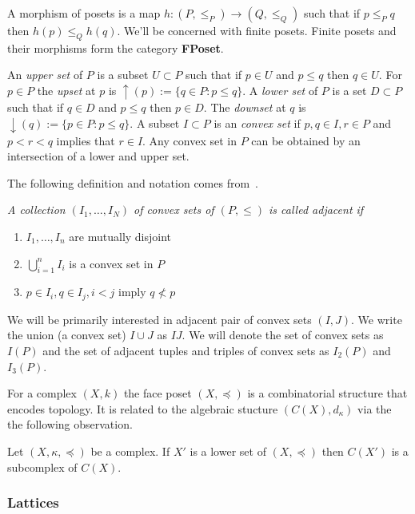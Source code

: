 A morphism of posets is a map $h:(P,\leq_P)\to (Q,\leq_Q)$ such that if $p\leq_P q$ then $h(p)\leq_Q h(q)$.  We'll be concerned with finite posets.  Finite posets and their morphisms form the category {\bf FPoset}.

 An {\em upper set} of $P$ is a subset $U\subset P$ such that if $p\in U$ and $p\leq q$ then $q\in U$.  For $p\in P$ the {\em upset} at $p$ is $\uparrow(p):=\{q\in P:p \leq q\}$.  A {\em lower set} of $P$ is a set $D\subset P$ such that if $q\in D$ and $p\leq q$ then $p\in D$.  The {\em downset} at $q$ is $\downarrow(q):=\{p\in P: p \leq q\}$.  A subset $I\subset P$ is an {\em convex set} if $p,q\in I, r\in P$ and $ p < r < q$ implies that $r\in I$.  Any convex set in $P$ can be obtained by an intersection of a lower and upper set.  
 
 
 The following definition and notation comes from~\cite{fran}.
\begin{defn}
{\em
A collection $(I_1,\ldots, I_N)$ of convex sets of $(P,\leq)$ is called {\em adjacent} if
\begin{enumerate}
\item $I_1,\ldots,I_n$ are mutually disjoint
\item $\bigcup_{i=1}^n I_i$ is a convex set in $P$
\item $p\in I_i, q\in I_j, i < j$ imply $q \nless p$
\end{enumerate}
}
\end{defn}

We will be primarily interested in adjacent pair of convex sets $(I,J)$.  We write the union (a convex set) $I\cup J$ as $IJ$.  We will denote the set of convex sets as $I(P)$ and the set of adjacent tuples and triples of convex sets as $I_2(P)$ and $I_3(P)$.  

For a complex $(X,k)$ the face poset $(X,\preceq)$ is a combinatorial structure that encodes topology.  It is related to the algebraic stucture $(C(X),d_\kappa)$ via the the following observation.

\begin{prop}
Let $(X,\kappa,\preceq)$ be a complex.  If $X'$ is a lower set of $(X,\preceq)$ then $C(X')$ is a subcomplex of $C(X)$.
\end{prop}



\subsubsection{Lattices}

